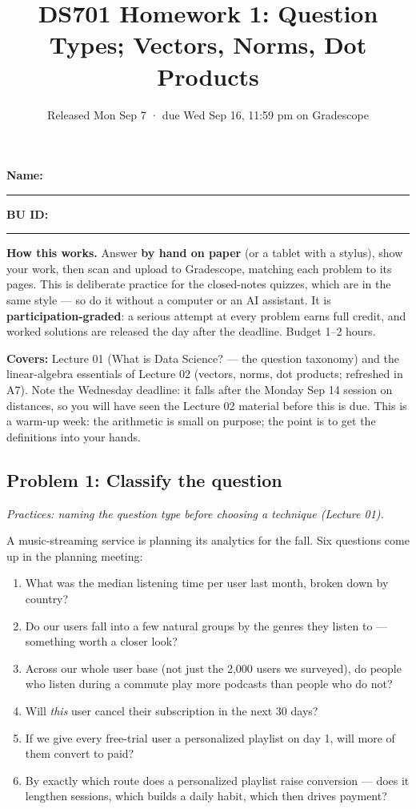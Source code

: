\documentclass[
  11pt,
]{article}
\title{DS701 Homework 1: Question Types; Vectors, Norms, Dot Products}
\subtitle{Released Mon Sep 7 · due Wed Sep 16, 11:59 pm on Gradescope}
\author{}
\date{}
\providecommand{\tightlist}{%
  \setlength{\itemsep}{0pt}\setlength{\parskip}{0pt}}
\begin{document}
\maketitle


\noindent\textbf{Name:}\ \rule{2.0in}{0.4pt}\qquad\textbf{BU ID:}\ \rule{1.2in}{0.4pt}
\vspace{6pt}

\textbf{How this works.} Answer \textbf{by hand on paper} (or a tablet
with a stylus), show your work, then scan and upload to Gradescope,
matching each problem to its pages. This is deliberate practice for the
closed-notes quizzes, which are in the same style --- so do it without a
computer or an AI assistant. It is \textbf{participation-graded}: a
serious attempt at every problem earns full credit, and worked solutions
are released the day after the deadline. Budget 1--2 hours.

\textbf{Covers:} Lecture 01 (What is Data Science? --- the question
taxonomy) and the linear-algebra essentials of Lecture 02 (vectors,
norms, dot products; refreshed in A7). Note the Wednesday deadline: it
falls after the Monday Sep 14 session on distances, so you will have
seen the Lecture 02 material before this is due. This is a warm-up week:
the arithmetic is small on purpose; the point is to get the definitions
into your hands.

\subsection{Problem 1: Classify the
question}\label{problem-1-classify-the-question}

\emph{Practices: naming the question type before choosing a technique
(Lecture 01).}

A music-streaming service is planning its analytics for the fall. Six
questions come up in the planning meeting:

\begin{enumerate}
\def\labelenumi{\arabic{enumi}.}
\tightlist
\item
  What was the median listening time per user last month, broken down by
  country?
\item
  Do our users fall into a few natural groups by the genres they listen
  to --- something worth a closer look?
\item
  Across our whole user base (not just the 2,000 users we surveyed), do
  people who listen during a commute play more podcasts than people who
  do not?
\item
  Will \emph{this} user cancel their subscription in the next 30 days?
\item
  If we give every free-trial user a personalized playlist on day 1,
  will more of them convert to paid?
\item
  By exactly which route does a personalized playlist raise conversion
  --- does it lengthen sessions, which builds a daily habit, which then
  drives payment?
\end{enumerate}
\end{document}
